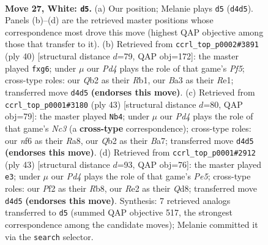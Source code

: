 \documentclass[11pt]{article}
\begin{document}
\clearpage

\begin{figure}[p]\centering
\begin{subfigure}{0.46\textwidth}\centering
\resizebox{\linewidth}{!}{%
\newchessgame
\chessboard[
  setfen={rnbqr1k1/5p2/1p3np1/4p2p/p1PP4/B4NPP/PQ2RP2/RB4K1 w - - 0 27},
  showmover=false,
  pgfstyle=straightmove, color=movearrow, markmove={d4-d5}
]}
\caption{}
\end{subfigure}\hfill
\begin{subfigure}{0.46\textwidth}\centering
\resizebox{\linewidth}{!}{%
\newchessgame
\chessboard[
  setfen={1r2r1k1/2pqnp1p/p4bp1/1p3P2/3PBB2/2P3Q1/P4P1P/1R2R1K1 w - - 2 21},
  showmover=false,
  pgfstyle=straightmove, color=movearrow, markmove={f5-g6}
]}
\caption{}
\end{subfigure}
\\[4pt]
\begin{subfigure}{0.46\textwidth}\centering
\resizebox{\linewidth}{!}{%
\newchessgame
\chessboard[
  setfen={r2r2k1/bbp1qpp1/p1n4p/P2P4/2P1p3/1N3N1P/R4PP1/2BQR1K1 b - - 0 22},
  showmover=false,
  pgfstyle=straightmove, color=movearrow, markmove={c6-b4}
]}
\caption{}
\end{subfigure}\hfill
\begin{subfigure}{0.46\textwidth}\centering
\resizebox{\linewidth}{!}{%
\newchessgame
\chessboard[
  setfen={1r1qr1k1/5pb1/5np1/p2P1b1p/N1R1p3/1P4PP/P2QNPB1/3R2K1 b - - 1 22},
  showmover=false,
  pgfstyle=straightmove, color=movearrow, markmove={e4-e3}
]}
\caption{}
\end{subfigure}
\caption{\textbf{Move 27, White: \texttt{d5}.} (a) Our position; Melanie plays \texttt{d5} (\texttt{d4d5}). Panels (b)--(d) are the retrieved master positions whose correspondence most drove this move (highest QAP objective among those that transfer to it). (b) Retrieved from \texttt{ccrl\_top\_p0002\#3891} (ply 40) [structural distance $d$=79, QAP obj=172]: the master played \texttt{fxg6}; under $\mu$ our \emph{Pd4} plays the role of that game's \emph{Pf5}; cross-type roles: our \emph{Q}b2 as their \emph{R}b1, our \emph{B}a3 as their \emph{R}e1; transferred move \texttt{d4d5} \textbf{(endorses this move)}. (c) Retrieved from \texttt{ccrl\_top\_p0001\#3180} (ply 43) [structural distance $d$=80, QAP obj=79]: the master played \texttt{Nb4}; under $\mu$ our \emph{Pd4} plays the role of that game's \emph{Nc3} (a \textbf{cross-type} correspondence); cross-type roles: our \emph{n}f6 as their \emph{R}a8, our \emph{Q}b2 as their \emph{B}a7; transferred move \texttt{d4d5} \textbf{(endorses this move)}. (d) Retrieved from \texttt{ccrl\_top\_p0001\#2912} (ply 43) [structural distance $d$=93, QAP obj=76]: the master played \texttt{e3}; under $\mu$ our \emph{Pd4} plays the role of that game's \emph{Pe5}; cross-type roles: our \emph{P}f2 as their \emph{R}b8, our \emph{R}e2 as their \emph{Q}d8; transferred move \texttt{d4d5} \textbf{(endorses this move)}. Synthesis: 7 retrieved analogs transferred to \texttt{d5} (summed QAP objective 517, the strongest correspondence among the candidate moves); Melanie committed it via the \texttt{search} selector.}
\label{fig:thought-m52}
\end{figure}
\end{document}
